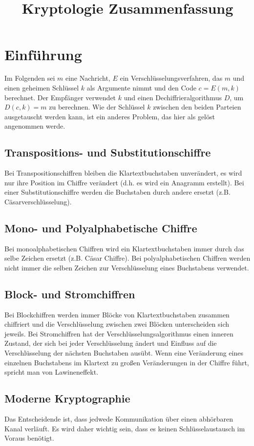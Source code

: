 \documentclass[a4paper, 12pt]{article}
\theoremstyle{plain}
\theoremstyle{definition}
\theoremstyle{lemma}
\theoremstyle{remark}
\theoremstyle{corollary}
\theoremstyle{example}
\begin{document}
	\begin{titlepage} 
		\title{Kryptologie Zusammenfassung}
		\clearpage\maketitle
		\thispagestyle{empty}
	\end{titlepage}
	\tableofcontents
	\newpage
	\section{Einführung}
	Im Folgenden sei $m$ eine Nachricht, $E$ ein Verschlüsselungsverfahren, das $m$ und einen geheimen Schlüssel $k$ als Argumente nimmt und den Code $c = E(m,k)$ berechnet. Der Empfänger verwendet $k$ und einen Dechiffrieralgorithmus $D$, um $D(c,k) = m$ zu berechnen. Wie der Schlüssel $k$ zwischen den beiden Parteien ausgetauscht werden kann, ist ein anderes Problem, das hier als gelöst angenommen werde.
	\subsection{Transpositions- und Substitutionschiffre}
	Bei Transpositionschiffren bleiben die Klartextbuchstaben unverändert, es wird nur ihre Position im Chiffre verändert (d.h. es wird ein Anagramm erstellt). Bei einer Substitutionschiffre werden die Buchstaben durch andere ersetzt (z.B. Cäsarverschlüsselung).
	\subsection{Mono- und Polyalphabetische Chiffre}
	Bei monoalphabetischen Chiffren wird ein Klartextbuchstaben immer durch das selbe Zeichen ersetzt (z.B. Cäsar Chiffre). Bei polyalphabetischen Chiffren werden nicht immer die selben Zeichen zur Verschlüsselung eines Buchstabens verwendet.
	\subsection{Block- und Stromchiffren}
	Bei Blockchiffren werden immer Blöcke von Klartextbuchstaben zusammen chiffriert und die Verschlüsselung zwischen zwei Blöcken unterscheiden sich jeweils. Bei Stromchiffren hat der Verschlüsselungsalgorithmus einen inneren Zustand, der sich bei jeder Verschlüsselung ändert und Einfluss auf die Verschlüsselung der nächsten Buchstaben ausübt. Wenn eine Veränderung eines einzelnen Buchstabens im Klartext zu großen Veränderungen in der Chiffre führt, spricht man von Lawineneffekt.
	\subsection{Moderne Kryptographie}
	Das Entscheidende ist, dass jedwede Kommunikation über einen abhörbaren Kanal verläuft. Es wird daher wichtig sein, dass es keinen Schlüsselaustausch im Voraus benötigt.
\end{document}
